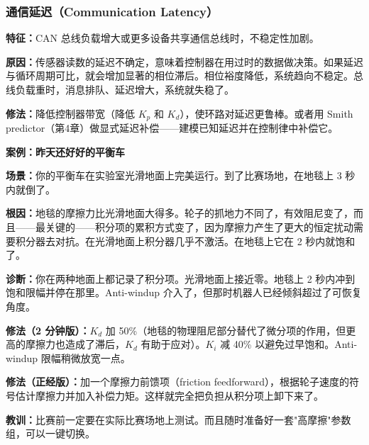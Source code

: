 \subsubsection{通信延迟（Communication Latency）}

\textbf{特征：}CAN 总线负载增大或更多设备共享通信总线时，不稳定性加剧。

\textbf{原因：}传感器读数的延迟不确定，意味着控制器在用过时的数据做决策。如果延迟与循环周期可比，就会增加显著的相位滞后。相位裕度降低，系统趋向不稳定。总线负载重时，消息排队、延迟增大，系统就失稳了。

\textbf{修法：}降低控制器带宽（降低 $K_p$ 和 $K_d$），使环路对延迟更鲁棒。或者用 Smith predictor（第4章）做显式延迟补偿——建模已知延迟并在控制律中补偿它。



\begin{mdframed}[linewidth=1pt, innertopmargin=10pt, innerbottommargin=10pt]
\textbf{案例：昨天还好好的平衡车}

\vspace{0.3em}
\textbf{场景：}你的平衡车在实验室光滑地面上完美运行。到了比赛场地，在地毯上 3 秒内就倒了。

\textbf{根因：}地毯的摩擦力比光滑地面大得多。轮子的抓地力不同了，有效阻尼变了，而且——最关键的——积分项的累积方式变了，因为摩擦力产生了更大的恒定扰动需要积分器去对抗。在光滑地面上积分器几乎不激活。在地毯上它在 2 秒内就饱和了。

\textbf{诊断：}你在两种地面上都记录了积分项。光滑地面上接近零。地毯上 2 秒内冲到饱和限幅并停在那里。Anti-windup 介入了，但那时机器人已经倾斜超过了可恢复角度。

\textbf{修法（2 分钟版）：}$K_d$ 加 50\%（地毯的物理阻尼部分替代了微分项的作用，但更高的摩擦力也造成了滞后，$K_d$ 有助于应对）。$K_i$ 减 40\% 以避免过早饱和。Anti-windup 限幅稍微放宽一点。

\textbf{修法（正经版）：}加一个摩擦力前馈项（friction feedforward），根据轮子速度的符号估计摩擦力并加入补偿力矩。这样就完全把负担从积分项上卸下来了。

\textbf{教训：}比赛前一定要在实际比赛场地上测试。而且随时准备好一套"高摩擦"参数组，可以一键切换。
\end{mdframed}

\vspace{1em}

